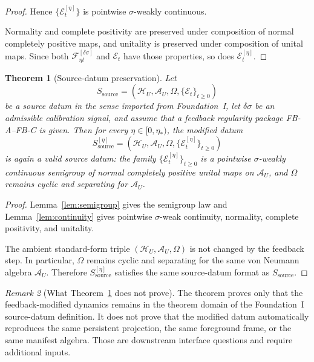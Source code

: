 \documentclass[12pt]{article}
\newtheorem{theorem}{Theorem}[section]
\theoremstyle{definition}
\theoremstyle{remark}
\newtheorem{remark}[theorem]{Remark}
\begin{document}
\begin{proof}
Hence \(\{\mathcal E_t^{[\eta]}\}\) is pointwise \(\sigma\)-weakly
continuous.

Normality and complete positivity are preserved under composition of
normal completely positive maps, and unitality is preserved under
composition of unital maps. Since both
\(\mathscr F_{\eta t}^{[\delta\sigma]}\) and \(\mathcal E_t\) have
those properties, so does \(\mathcal E_t^{[\eta]}\).
\end{proof}

\begin{theorem}[Source-datum preservation]\label{thm:preserve}
Let
\[
S_{\mathrm{source}}
=
(\mathcal H_U,\mathcal A_U,\Omega,\{\mathcal E_t\}_{t\ge0})
\]
be a source datum in the sense imported from Foundation~I, let
\(\delta\sigma\) be an admissible calibration signal, and assume that a
feedback regularity package FB-A--FB-C is given. Then for every
\(\eta\in[0,\eta_*)\), the modified datum
\[
S_{\mathrm{source}}^{[\eta]}
=
(\mathcal H_U,\mathcal A_U,\Omega,\{\mathcal E_t^{[\eta]}\}_{t\ge0})
\]
is again a valid source datum: the family
\(\{\mathcal E_t^{[\eta]}\}_{t\ge0}\) is a pointwise
\(\sigma\)-weakly continuous semigroup of normal completely positive
unital maps on \(\mathcal A_U\), and \(\Omega\) remains cyclic and
separating for \(\mathcal A_U\).
\end{theorem}

\begin{proof}
Lemma~\ref{lem:semigroup} gives the semigroup law and
Lemma~\ref{lem:continuity} gives pointwise \(\sigma\)-weak continuity,
normality, complete positivity, and unitality.

The ambient standard-form triple
\((\mathcal H_U,\mathcal A_U,\Omega)\) is not changed by the feedback
step. In particular, \(\Omega\) remains cyclic and separating for the
same von Neumann algebra \(\mathcal A_U\). Therefore
\(S_{\mathrm{source}}^{[\eta]}\) satisfies the same source-datum format
as \(S_{\mathrm{source}}\).
\end{proof}

\begin{remark}[What Theorem~\ref{thm:preserve} does not prove]
The theorem proves only that the feedback-modified dynamics remains in
the theorem domain of the Foundation~I source-datum definition. It does
not prove that the modified datum automatically reproduces the same
persistent projection, the same foreground frame, or the same manifest
algebra. Those are downstream interface questions and require additional
inputs.
\end{remark}
\end{document}
